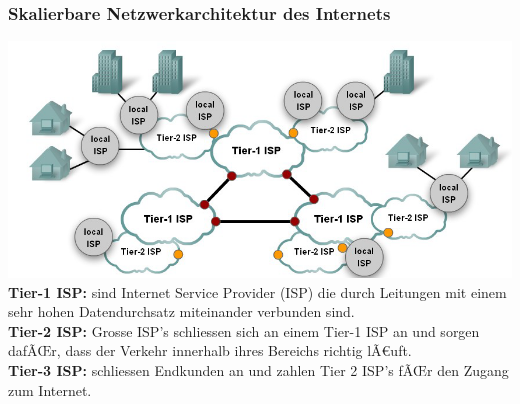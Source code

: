 \documentclass[a4paper,10pt]{article}
\newcommand{\Bold}[1]{\textbf{#1}} %
\begin{document}
\subsubsection{Skalierbare Netzwerkarchitektur des Internets}
\includegraphics[scale=0.5]{DNet1_Tiers.png}\\
\Bold{Tier-1 ISP:} sind Internet Service Provider (ISP) die durch Leitungen mit einem sehr hohen Datendurchsatz miteinander verbunden sind.\\
\Bold{Tier-2 ISP:} Grosse ISP's schliessen sich an einem Tier-1 ISP an und sorgen dafÃŒr, dass der Verkehr innerhalb ihres Bereichs richtig lÃ€uft.\\
\Bold{Tier-3 ISP:} schliessen Endkunden an und zahlen Tier 2 ISP's fÃŒr den Zugang zum Internet.
\end{document}
